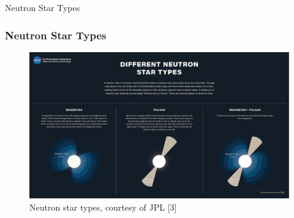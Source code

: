 \documentclass[hyperref=pdftex, presentation]{beamer}
\begin{document}
\begin{frame}{\Large Neutron Star Types}
\frametitle{\Large Neutron Star Types}

\begin{figure}
	\includegraphics[scale=.17]{figures/neutron_star_types.jpg}
	\caption{Neutron star types, courtesy of JPL [3]}
\end{figure}

\end{frame}

\end{document}
